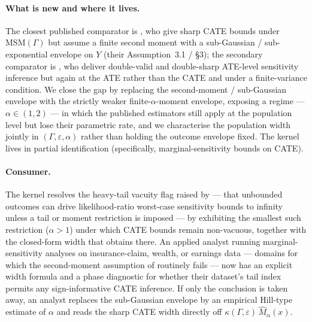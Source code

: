\documentclass[11pt]{article}
\theoremstyle{definition}
\theoremstyle{plain}
\theoremstyle{remark}
\begin{document}
\paragraph{What is new and where it lives.} The closest published comparator is \citet*{YadlowskyNamkoongBasuDuchiTian2022}, who give sharp CATE bounds under $\mathrm{MSM}(\Gamma)$ but assume a finite second moment with a sub-Gaussian / sub-exponential envelope on $Y$ (their Assumption~3.1 / §3); the secondary comparator is \citet*{DornGuoKallus2025}, who deliver double-valid and double-sharp ATE-level sensitivity inference but again at the ATE rather than the CATE and under a finite-variance condition. We close the gap by replacing the second-moment / sub-Gaussian envelope with the strictly weaker finite-$\alpha$-moment envelope, exposing a regime — $\alpha \in (1,2)$ — in which the published estimators still apply at the population level but lose their parametric rate, and we characterise the population width jointly in $(\Gamma,\varepsilon,\alpha)$ rather than holding the outcome envelope fixed. The kernel lives in partial identification (specifically, marginal-sensitivity bounds on CATE).

\paragraph{Consumer.} The kernel resolves the heavy-tail vacuity flag raised by \citet*{AsiaeePalBeckHuling2026SharpGeneralization} — that unbounded outcomes can drive likelihood-ratio worst-case sensitivity bounds to infinity unless a tail or moment restriction is imposed — by exhibiting the smallest such restriction ($\alpha > 1$) under which CATE bounds remain non-vacuous, together with the closed-form width that obtains there. An applied analyst running marginal-sensitivity analyses on insurance-claim, wealth, or earnings data — domains for which the second-moment assumption of \citet*{YadlowskyNamkoongBasuDuchiTian2022} routinely fails — now has an explicit width formula and a phase diagnostic for whether their dataset's tail index permits any sign-informative CATE inference. If only the conclusion is taken away, an analyst replaces the sub-Gaussian envelope by an empirical Hill-type estimate of $\alpha$ and reads the sharp CATE width directly off $\kappa(\Gamma,\varepsilon)\,\widehat{M}_\alpha(x)$.
\end{document}
